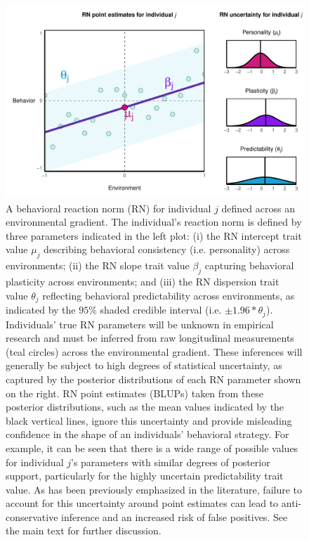 \documentclass{article}
\begin{document}
\begin{figure}
\hspace*{-1cm}
\includegraphics[scale=0.8]{fig1.pdf}
\caption{A behavioral reaction norm (RN) for individual $j$ defined across an environmental gradient. The individual's reaction norm is defined by three parameters indicated in the left plot: (i) the RN intercept trait value $\mu_j$ describing behavioral consistency (i.e. personality) across environments; (ii) the RN slope trait value $\beta_j$ capturing behavioral plasticity across environments; and (iii) the RN dispersion trait value $\theta_j$ reflecting behavioral predictability across environments, as indicated by the $95\%$ shaded credible interval (i.e. $\pm 1.96*\theta_j$).  Individuals' true RN parameters will be unknown in empirical research and must be inferred from raw longitudinal measurements (teal circles) across the environmental gradient. These inferences will generally be subject to high degrees of statistical uncertainty, as captured by the posterior distributions of each RN parameter shown on the right. RN point estimates (BLUPs) taken from these posterior distributions, such as the mean values indicated by the black vertical lines, ignore this uncertainty and provide misleading confidence in the shape of an individuals' behavioral strategy. For example, it can be seen that there is a wide range of possible values for individual $j$'s parameters with similar degrees of posterior support, particularly for the highly uncertain predictability trait value. As has been previously emphasized in the literature, failure to account for this uncertainty around point estimates can lead to anti-conservative inference and an increased risk of false positives. See the main text for further discussion.}
\label{fig:fig1}
\end{figure}
\end{document}
